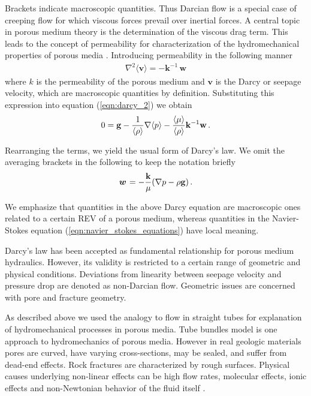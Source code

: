 Brackets indicate macroscopic quantities. Thus Darcian flow is a
special case of creeping flow for which viscous forces prevail
over inertial forces. A central topic in porous medium theory is
the determination of the viscous drag term. This leads to the
concept of permeability for characterization of the
hydromechanical properties of porous media \cite{Scheidegger:1974}.
Introducing permeability in the following manner
\begin{eqnarray}
\nabla^2 {\langle\mathbf{v}\rangle}
=
-
{\mathbf k}^{-1}
\, {\mathbf w}
\end{eqnarray}
where
$k$ is the permeability of the porous medium and
$\mathbf{v}$ is the Darcy or seepage velocity,
which are macroscopic quantities by definition.
Substituting this expression into equation (\ref{eqn:darcy_2})
we obtain
\begin{eqnarray}
0
=
{\bf g}
-
\frac {1}{\langle\rho\rangle}
\nabla \langle p \rangle
-
\frac{\langle\mu\rangle}{\langle\rho\rangle}
{\mathbf k}^{-1} {\mathbf w}
\, .
\end{eqnarray}

Rearranging the terms,
we yield the usual form of Darcy's law.
We omit the averaging brackets in the following to keep the notation briefly
\begin{eqnarray}
\mbox{${\mbox{\boldmath${w}$\unboldmath}}^{\:\!}$}
=
-
\frac{\mathbf k}{\mu}
(
\nabla p
-
\rho{\bf g}
)
\, .
\end{eqnarray}

We emphasize
that quantities in the above Darcy equation are macroscopic ones
related to a certain REV of a porous medium,
whereas quantities in the Navier-Stokes equation
(\ref{eqn:navier_stokes_equations}) have local meaning.

Darcy's law has been accepted
as fundamental relationship for porous medium hydraulics.
However, its validity
is restricted to a certain range of geometric and physical conditions.
Deviations from linearity between seepage velocity and pressure drop
are denoted as non-Darcian flow.
Geometric issues are concerned with pore and fracture geometry.

As described above we used the analogy to flow in straight tubes
for explanation of hydromechanical processes in porous media. Tube
bundles model is one approach to hydromechanics of porous media.
However in real geologic materials pores are curved, have varying
cross-sections, may be sealed, and suffer from dead-end effects.
Rock fractures are characterized by rough surfaces. Physical
causes underlying non-linear effects can be high flow rates,
molecular effects, ionic effects and non-Newtonian behavior of the
fluid itself \cite{Dullien:1979}.
